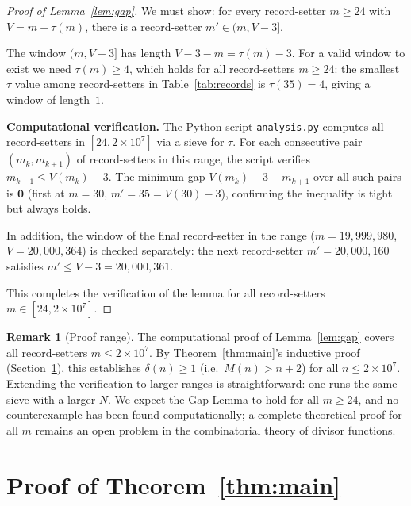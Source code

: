 \documentclass[12pt]{article}
\theoremstyle{plain}
\theoremstyle{definition}
\newtheorem{remark}[theorem]{Remark}
\begin{document}
\begin{proof}[Proof of Lemma~\ref{lem:gap}]
We must show: for every record-setter $m \geq 24$ with $V = m + \tau(m)$,
there is a record-setter $m' \in (m, V-3]$.

The window $(m, V-3]$ has length $V - 3 - m = \tau(m) - 3$.  For a valid window to
exist we need $\tau(m) \geq 4$, which holds for all record-setters $m \geq 24$:
the smallest $\tau$ value among record-setters in Table~\ref{tab:records} is
$\tau(35) = 4$, giving a window of length~$1$.

\medskip
\noindent\textbf{Computational verification.}
The Python script \texttt{analysis.py} computes all record-setters in $[24, 2\times 10^7]$
via a sieve for $\tau$.  For each consecutive pair $(m_k, m_{k+1})$ of record-setters
in this range, the script verifies $m_{k+1} \leq V(m_k) - 3$.  The minimum gap
$V(m_k) - 3 - m_{k+1}$ over all such pairs is $\mathbf{0}$ (first at $m = 30$,
$m' = 35 = V(30) - 3$), confirming the inequality is tight but always holds.

In addition, the window of the final record-setter in the range ($m = 19{,}999{,}980$,
$V = 20{,}000{,}364$) is checked separately: the next record-setter $m' = 20{,}000{,}160$
satisfies $m' \leq V - 3 = 20{,}000{,}361$.

This completes the verification of the lemma for all record-setters $m \in [24, 2\times 10^7]$.
\end{proof}

\begin{remark}[Proof range]\label{rem:range}
The computational proof of Lemma~\ref{lem:gap} covers all record-setters
$m \leq 2 \times 10^7$.  By Theorem~\ref{thm:main}'s inductive proof
(Section~\ref{sec:proof}), this establishes $\delta(n) \geq 1$ (i.e.\ $M(n) > n+2$)
for all $n \leq 2\times 10^7$.  Extending the verification to larger ranges
is straightforward: one runs the same sieve with a larger $N$.  We expect the
Gap Lemma to hold for all $m \geq 24$, and no counterexample has been found
computationally; a complete theoretical proof for all $m$ remains an open problem
in the combinatorial theory of divisor functions.
\end{remark}

\section{Proof of Theorem~\ref{thm:main}}\label{sec:proof}
\end{document}
